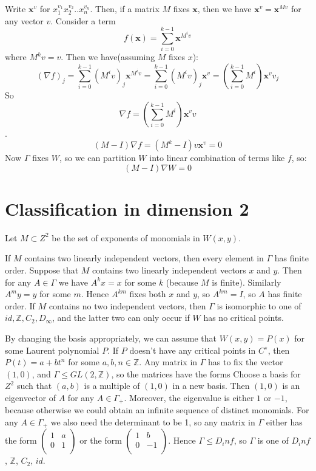\documentclass[a4paper]{article}
\begin{document}
	Write $\textbf{x}^v$ for $x_1^{v_1} x_2^{v_2} .. x_n^{v_n}$. Then, if a matrix $M$ fixes $\textbf{x}$, then we have $\textbf{x}^v = \textbf{x}^{Mv}$ for any vector $v$.
	Consider a term 
	$$f(\textbf{x}) = \sum_{i=0}^{k-1} \textbf{x}^{M^i v}$$
	where $M^k v =v$.
	Then we have(assuming $M$ fixes $x$):
	$$(\nabla f)_j = \sum_{i=0}^{k-1} (M^i v)_j \textbf{x}^{M^i v} = \sum_{i=0}^{k-1} (M^i v)_j \textbf{x}^{v} = (\sum_{i=0}^{k-1} M^i) \textbf{x}^{v} v_j$$
	So $$\nabla f = (\sum_{i=0}^{k-1} M^i) \textbf{x}^{v} v$$.
	$$(M-I)\nabla f= (M^k-I)v \textbf{x}^{v}= 0$$
	Now $\Gamma$ fixes $W$, so we can partition $W$ into linear combination of terms like $f$, so:
	$$(M-I)\nabla W = 0$$
    \section{Classification in dimension 2}
    	Let $M \subset Z^2$ be the set of exponents of monomials in $W(x,y)$.
    
    \clm If $M$ contains two linearly independent vectors, then every element in $\Gamma$ has finite order.
    Suppose that $M$ contains two linearly independent vectors $x$ and $y$. Then for any $A \in \Gamma$ we have $A^k x= x$ for some $k$ (because $M$ is finite). Similarly $A^m y = y$ for some $m$. Hence $A^{k m}$ fixes both $x$ and $y$, so $A^{k m} = I$, so $A$ has finite order.
    \clm If $M$ contains no two independent vectors, then $\Gamma$ is isomorphic to one of $ id, \mathbb{Z}, C_2, D_{\infty}$, and the latter two can only occur if $W$ has no critical points.
    
    
    By changing the basis appropriately, we can assume that $W(x, y) = P(x)$ for some Laurent polynomial $P$.
    If $P$ doesn't have any critical points in $C^\star$, then $P(t) =a+ b t^n$ for some $a, b, n \in \mathbb{Z}$.
    Any matrix in $\Gamma$ has to fix the vector $(1,0)$, and $\Gamma \leq GL(2,\mathbb{Z})$, so the matrices have the forms
    Choose a basis for $Z^2$ such that $(a,b)$ is a multiple of $(1,0)$ in a new basis. Then $(1,0)$ is an eigenvector of $A$ for any $A \in \Gamma_+$. Moreover, the eigenvalue is either $1$ or $-1$, because otherwise we could obtain an infinite sequence of distinct monomials. For any $A \in \Gamma_+$ we also need the determinant to be 1, so any matrix in $\Gamma$ either has the form
    $\begin{pmatrix}
    1 & a \\
    0 & 1 \\
    \end{pmatrix}$ or the form 
    $\begin{pmatrix}
    1 & b \\
    0 & -1 \\
    \end{pmatrix}$. Hence $\Gamma \leq D_inf$, so $\Gamma$ is one of $D_inf$, $\mathbb{Z}$, $C_2$, $id$.
    
\end{document}
